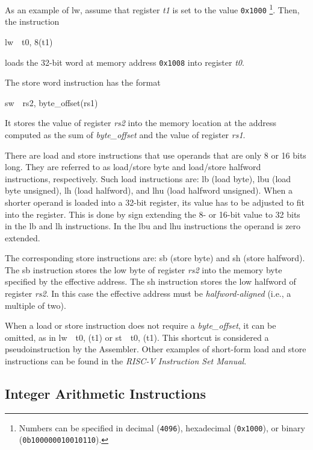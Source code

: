 \documentclass[11pt, twoside, pdftex]{article}
\begin{document}
As an example of {\sf lw}, assume that register {\it t1} is set to the 
value \texttt{0x1000} \footnote{Numbers can be 
specified in decimal (\texttt{4096}), hexadecimal (\texttt{0x1000}), or binary 
(\texttt{0b100000010010110}).}.  Then, the instruction
\vspace{-\baselineskip}
\begin{center}
{\sf lw~~t0, 8(t1)}
\end{center}
\noindent
loads the 32-bit word at memory address \texttt{0x1008} into register {\it t0}.

The store word instruction has the format
\vspace{-\baselineskip}
\begin{center}
{\sf sw~~rs2, byte\_offset(rs1)}
\end{center}
\noindent 
It stores the value of register {\it rs2} into the memory location at the address
computed as the sum of {\it byte\_offset} and the value of register {\it rs1}. 
 
There are load and store instructions that use operands that are only 8 or 16 bits long.
They are referred to as load/store byte and load/store halfword instructions, respectively.
Such load instructions are: {\sf lb} (load byte), {\sf lbu} (load byte unsigned),
{\sf lh} (load halfword), and {\sf lhu} (load halfword unsigned). 
When a shorter operand is loaded into a 32-bit register, its value has to be adjusted
to fit into the register. This is done by sign extending the 8- or 16-bit value to 32 bits
in the {\sf lb} and {\sf lh} instructions. In the {\sf lbu} and {\sf lhu} instructions
the operand is zero extended.

The corresponding store instructions are: {\sf sb} (store byte) and {\sf sh} (store halfword).
The {\sf sb} instruction stores the low byte of register {\it rs2} into the memory byte
specified by the effective address. The {\sf sh} instruction stores the low halfword
of register {\it rs2}. In this case the effective address must be {\it halfword-aligned}
(i.e., a multiple of two).

When a load or store instruction does not require a {\it byte\_offset}, it can be omitted,
as in {\sf lw~~t0, (t1)} or {\sf st~~t0, (t1)}. This shortcut is considered a
pseudoinstruction by the Assembler. Other examples of short-form load and store
instructions can be found in the {\it RISC-V Instruction Set Manual}.

\subsection{Integer Arithmetic Instructions}
\end{document}
